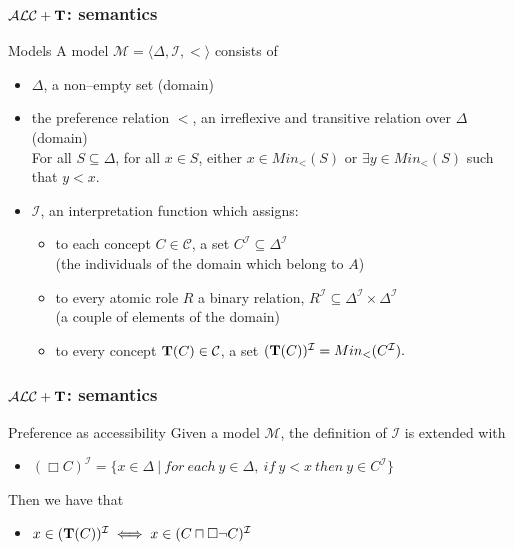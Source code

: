 \documentclass[serif,mathserif]{beamer}
\newcommand{\tip}{{\bf T}}
\newcommand{\alct}{\mathcal{ALC}+\tip}
\begin{document}
\begin{frame}
	\frametitle{$\alct$: semantics}
	\begin{block}{Models}
	A model $\mathcal{M} = \langle \Delta, \mathcal{I}, < \rangle$ consists of
	\begin{itemize}
	\item $\Delta$, a non--empty set (domain)
	\item the preference relation $<$, an irreflexive and transitive relation over $\Delta$ (domain)\\
	\footnotesize
	For all $S\subseteq \Delta$, for all $x \in S$, either $x \in Min_<(S)$ or $\exists y \in  Min_<(S)$ such that $y < x$.
	\normalsize
	\item $\mathcal{I}$, an interpretation function which assigns:
		\begin{itemize}
		\item to each concept $C \in \mathcal{C}$, a set $C^{\mathcal{I}} \subseteq \Delta^{\mathcal{I}}$\\
		(the individuals of the domain which belong to $A$)
		\item to every atomic role $R$ a binary relation, $R^{\mathcal{I}} \subseteq \Delta^{\mathcal{I}} \times \Delta^{\mathcal{I}}$\\
		(a couple of elements of the domain)
		\item \alert{to every concept $\tip(C) \in \mathcal{C}$, a set $(\tip(C))^\mathcal{I} = Min_<(C^\mathcal{I}).$}
		\end{itemize}
	\end{itemize}
	\end{block}
\end{frame}

\begin{frame}
	\frametitle{$\alct$: semantics}
	\begin{block}{Preference as accessibility}
	Given a model $\mathcal{M}$, the definition of $\mathcal{I}$ is extended with
	\begin{itemize}
	\item $(\Box C)^\mathcal{I} = \{ x \in \Delta \ |\ for\ each\ y \in \Delta,\ if\ y<x\ then\ y \in C^\mathcal{I}\}$
	\end{itemize}
	Then we have that
	\begin{itemize}
	\item $x\in(\tip(C))^\mathcal{I} \iff x \in(C\sqcap \Box \neg C)^\mathcal{I}$
	\end{itemize}
	\end{block}
\end{frame}
\end{document}
